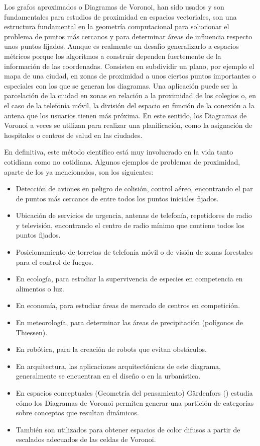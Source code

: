 Los grafos aproximados o Diagramas de Voronoi, han sido usados y son fundamentales para estudios de proximidad en espacios vectoriales, son una estructura fundamental en la geometría computacional para solucionar el problema de puntos más cercanos y para determinar áreas de influencia respecto unos puntos fijados. Aunque es realmente un desafío generalizarlo a espacios métricos porque los algoritmos a construir dependen fuertemente de la información de las coordenadas. Consisten en subdividir un plano, por ejemplo el mapa de una ciudad, en zonas de proximidad a unos ciertos puntos importantes o especiales con los que se generan los diagramas. Una aplicación puede ser la parcelación de la ciudad en zonas en relación a la proximidad de los colegios o, en el caso de la telefonía móvil, la división del espacio en función de la conexión a la antena que los usuarios tienen más próxima. En este sentido, los Diagramas de Voronoi a veces se utilizan para realizar una planificación, como la asignación de hospitales o centros de salud en las ciudades.
\vspace{0.3cm}

En definitiva, este método científico está muy involucrado en la vida tanto cotidiana como no cotidiana. Algunos ejemplos de problemas de proximidad, aparte de los ya mencionados, son los siguientes:

\begin{itemize}
    \item Detección de aviones en peligro de colisión, control aéreo, encontrando el par de puntos más cercanos de entre todos los puntos iniciales fijados.
    \item Ubicación de servicios de urgencia, antenas de telefonía, repetidores de radio y televisión, encontrando el centro de radio mínimo que contiene todos los puntos fijados.
    \item Posicionamiento de torretas de telefonía móvil o de visión de zonas forestales para el control de fuegos.
    \item En ecología, para estudiar la supervivencia de especies en competencia en alimentos o luz.
    \item En economía, para estudiar áreas de mercado de centros en competición.
    \item En meteorología, para determinar las áreas de precipitación (polígonos de Thiessen).
    \item En robótica, para la creación de robots que evitan obstáculos.
    \item En arquitectura, las aplicaciones arquitectónicas de este diagrama, generalmente se encuentran en el diseño o en la urbanística.
    \item En espacios conceptuales (Geometría del pensamiento) Gärdenfors (\cite{gardenfor}) estudia cómo los Diagramas de Voronoi permiten generar una partición de categorías sobre conceptos que resultan dinámicos.
    \item También son utilizados para obtener espacios de color difusos a partir de escalados adecuados de las celdas de Voronoi.
\end{itemize}
\vspace{0.3cm}
    
